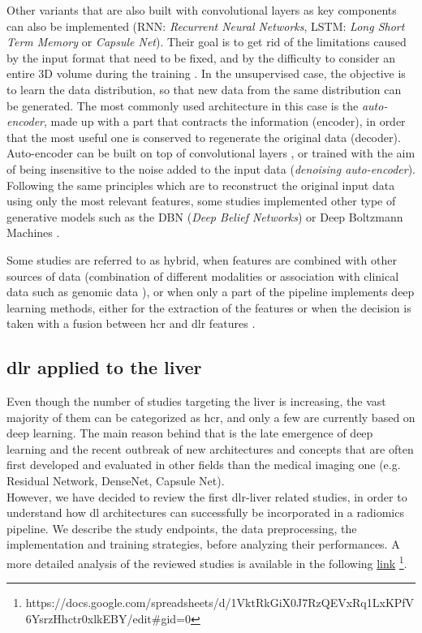Other variants that are also built with convolutional layers as key
components can also be implemented (RNN: \emph{Recurrent Neural Networks}, LSTM: \emph{Long Short Term Memory} or
\emph{Capsule Net}). Their goal is to get rid of the limitations caused
by the input format that need to be fixed, and by the difficulty to
consider an entire 3D volume during the training \cite{Azizi2018}.
In the unsupervised case, the objective is to learn the data distribution,
so that new data from the same distribution can be generated. 
The most commonly used architecture
in this case is the \emph{auto-encoder}, made up with a part that
contracts the information (encoder), in order that the most useful one
is conserved to regenerate the original data (decoder). Auto-encoder can
be built on top of convolutional layers \cite{Echaniz2017}, 
or trained with the aim of being insensitive to the noise
added to the input data (\emph{denoising auto-encoder})\cite{Sun2017a,Kim2016}. 
Following the same principles which are to reconstruct the
original input data using only the most relevant features, some studies
implemented other type of generative models such as the 
DBN (\emph{Deep Belief Networks}) \cite{Sun2017a} or Deep Boltzmann Machines \cite{Suk2014}.

Some studies are referred to as hybrid, when features are combined with
other sources of data (combination of different modalities 
\cite{Oikonomou2018} or association with clinical
data such as genomic data \cite{Emaminejad2016}), or
when only a part of the pipeline implements deep learning methods,
either for the extraction of the features \cite{Paul2016} or when the decision is taken with a fusion between \ac{hcr}
and \ac{dlr} features \cite{Huynh2016}.

\subsection{\ac{dlr} applied to the liver}\label{dlr-applied-to-the-liver}

Even though the number of studies targeting the liver is increasing, the
vast majority of them can be categorized as \ac{hcr}, and only a few
are currently based on deep learning.
The main reason behind that is the late emergence of deep learning and
the recent outbreak of new architectures and concepts that are often
first developed and evaluated in other fields than the medical imaging
one (e.g. Residual Network, DenseNet, Capsule Net).\\
However, we have decided to review the first \ac{dlr}-liver related studies, in order to understand how \ac{dl} architectures can successfully be incorporated in a radiomics pipeline. We describe the study endpoints, the data preprocessing, the implementation and training strategies, before analyzing their performances. A more detailed analysis of the reviewed studies is available in the following \href{https://docs.google.com/spreadsheets/d/1VktRkGiX0J7RzQEVxRq1LxKPfV6YsrzHhctr0xlkEBY/edit#gid=0}{link} \footnote{https://docs.google.com/spreadsheets/d/1VktRkGiX0J7RzQEVxRq1LxKPfV6YsrzHhctr0xlkEBY/edit\#gid=0}.

